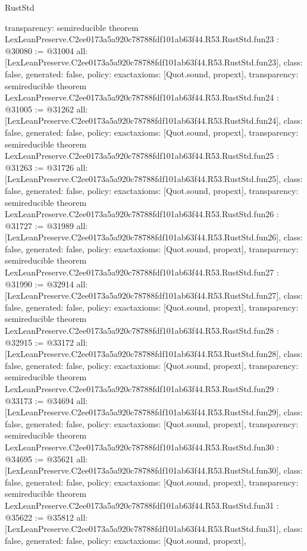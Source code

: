 \begin{lexlean}{RustStd}
\begin{coremodule}
{  transparency: semireducible
}
theorem LexLeanPreserve.C2ee0173a5a920c78788fdf101ab63f44.R53.RustStd.fun23 : @30080 := @31004 {
  all: [LexLeanPreserve.C2ee0173a5a920c78788fdf101ab63f44.R53.RustStd.fun23],
  class: false,
  generated: false,
  policy: exact{axioms: [Quot.sound, propext]},
  transparency: semireducible
}
theorem LexLeanPreserve.C2ee0173a5a920c78788fdf101ab63f44.R53.RustStd.fun24 : @31005 := @31262 {
  all: [LexLeanPreserve.C2ee0173a5a920c78788fdf101ab63f44.R53.RustStd.fun24],
  class: false,
  generated: false,
  policy: exact{axioms: [Quot.sound, propext]},
  transparency: semireducible
}
theorem LexLeanPreserve.C2ee0173a5a920c78788fdf101ab63f44.R53.RustStd.fun25 : @31263 := @31726 {
  all: [LexLeanPreserve.C2ee0173a5a920c78788fdf101ab63f44.R53.RustStd.fun25],
  class: false,
  generated: false,
  policy: exact{axioms: [Quot.sound, propext]},
  transparency: semireducible
}
theorem LexLeanPreserve.C2ee0173a5a920c78788fdf101ab63f44.R53.RustStd.fun26 : @31727 := @31989 {
  all: [LexLeanPreserve.C2ee0173a5a920c78788fdf101ab63f44.R53.RustStd.fun26],
  class: false,
  generated: false,
  policy: exact{axioms: [Quot.sound, propext]},
  transparency: semireducible
}
theorem LexLeanPreserve.C2ee0173a5a920c78788fdf101ab63f44.R53.RustStd.fun27 : @31990 := @32914 {
  all: [LexLeanPreserve.C2ee0173a5a920c78788fdf101ab63f44.R53.RustStd.fun27],
  class: false,
  generated: false,
  policy: exact{axioms: [Quot.sound, propext]},
  transparency: semireducible
}
theorem LexLeanPreserve.C2ee0173a5a920c78788fdf101ab63f44.R53.RustStd.fun28 : @32915 := @33172 {
  all: [LexLeanPreserve.C2ee0173a5a920c78788fdf101ab63f44.R53.RustStd.fun28],
  class: false,
  generated: false,
  policy: exact{axioms: [Quot.sound, propext]},
  transparency: semireducible
}
theorem LexLeanPreserve.C2ee0173a5a920c78788fdf101ab63f44.R53.RustStd.fun29 : @33173 := @34694 {
  all: [LexLeanPreserve.C2ee0173a5a920c78788fdf101ab63f44.R53.RustStd.fun29],
  class: false,
  generated: false,
  policy: exact{axioms: [Quot.sound, propext]},
  transparency: semireducible
}
theorem LexLeanPreserve.C2ee0173a5a920c78788fdf101ab63f44.R53.RustStd.fun30 : @34695 := @35621 {
  all: [LexLeanPreserve.C2ee0173a5a920c78788fdf101ab63f44.R53.RustStd.fun30],
  class: false,
  generated: false,
  policy: exact{axioms: [Quot.sound, propext]},
  transparency: semireducible
}
theorem LexLeanPreserve.C2ee0173a5a920c78788fdf101ab63f44.R53.RustStd.fun31 : @35622 := @35812 {
  all: [LexLeanPreserve.C2ee0173a5a920c78788fdf101ab63f44.R53.RustStd.fun31],
  class: false,
  generated: false,
  policy: exact{axioms: [Quot.sound, propext]},
}
\end{coremodule}
\end{lexlean}

